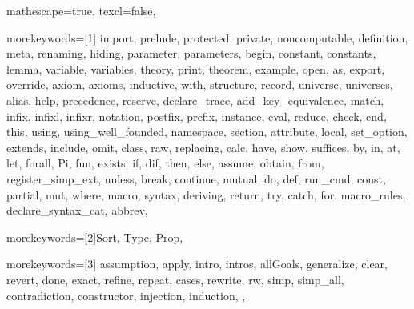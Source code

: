 
 {

mathescape=true,
texcl=false,

morekeywords=[1]{
import, prelude, protected, private, noncomputable, definition, meta, renaming,
hiding, parameter, parameters, begin, constant, constants,
lemma, variable, variables, theory,
print, theorem, example,
open, as, export, override, axiom, axioms, inductive, with,
structure, record, universe, universes,
alias, help, precedence, reserve, declare_trace, add_key_equivalence,
match, infix, infixl, infixr, notation, postfix, prefix, instance,
eval, reduce, check, end, this,
using, using_well_founded, namespace, section,
attribute, local, set_option, extends, include, omit, class,
raw, replacing,
calc, have, show, suffices, by, in, at, let, forall, Pi, fun,
exists, if, dif, then, else, assume, obtain, from, register_simp_ext, unless, break, continue,
mutual, do, def, run_cmd, const,
partial, mut, where, macro, syntax, deriving,
return, try, catch, for, macro_rules, declare_syntax_cat, abbrev},

morekeywords=[2]{Sort, Type, Prop},

morekeywords=[3]{
assumption,
apply, intro, intros, allGoals,
generalize, clear, revert, done, exact,
refine, repeat, cases, rewrite, rw,
simp, simp_all, contradiction,
constructor, injection,
induction,
},


}

